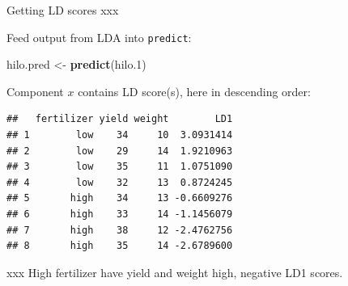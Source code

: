 \documentclass[ignorenonframetext,]{beamer}
\newenvironment{Shaded}{\begin{snugshade}}{\end{snugshade}}
\newcommand{\FloatTok}[1]{\textcolor[rgb]{0.00,0.00,0.81}{#1}}
\newcommand{\KeywordTok}[1]{\textcolor[rgb]{0.13,0.29,0.53}{\textbf{#1}}}
\newcommand{\NormalTok}[1]{#1}
\newcommand{\OperatorTok}[1]{\textcolor[rgb]{0.81,0.36,0.00}{\textbf{#1}}}
\newcommand{\StringTok}[1]{\textcolor[rgb]{0.31,0.60,0.02}{#1}}
\begin{document}
\begin{frame}[fragile]{Getting LD scores xxx}
\protect\hypertarget{getting-ld-scores-xxx}{}

Feed output from LDA into \texttt{predict}:

\begin{Shaded}
\begin{Highlighting}[]
\NormalTok{hilo.pred <-}\StringTok{ }\KeywordTok{predict}\NormalTok{(hilo}\FloatTok{.1}\NormalTok{)}
\end{Highlighting}
\end{Shaded}

Component \(x\) contains LD score(s), here in descending order:

\footnotesize

\begin{Shaded}
\end{Shaded}

\begin{verbatim}
##   fertilizer yield weight        LD1
## 1        low    34     10  3.0931414
## 2        low    29     14  1.9210963
## 3        low    35     11  1.0751090
## 4        low    32     13  0.8724245
## 5       high    34     13 -0.6609276
## 6       high    33     14 -1.1456079
## 7       high    38     12 -2.4762756
## 8       high    35     14 -2.6789600
\end{verbatim}

\normalsize

xxx High fertilizer have yield and weight high, negative LD1 scores.

\end{frame}
\end{document}
